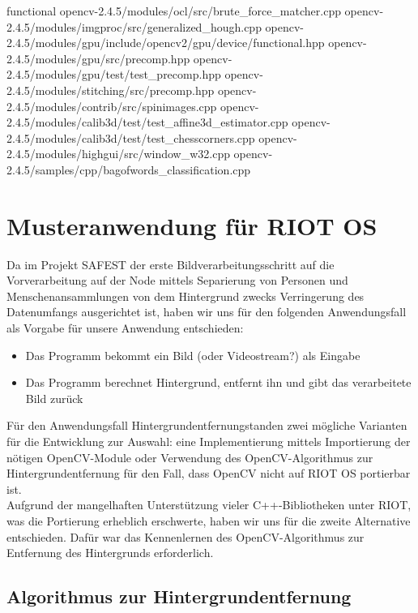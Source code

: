 \documentclass[10pt,a4paper]{article}
\begin{document}
functional \newline
opencv-2.4.5/modules/ocl/src/brute\_force\_matcher.cpp
opencv-2.4.5/modules/imgproc/src/generalized\_hough.cpp
opencv-2.4.5/modules/gpu/include/opencv2/gpu/device/functional.hpp
opencv-2.4.5/modules/gpu/src/precomp.hpp
opencv-2.4.5/modules/gpu/test/test\_precomp.hpp
opencv-2.4.5/modules/stitching/src/precomp.hpp
opencv-2.4.5/modules/contrib/src/spinimages.cpp
opencv-2.4.5/modules/calib3d/test/test\_affine3d\_estimator.cpp
opencv-2.4.5/modules/calib3d/test/test\_chesscorners.cpp
opencv-2.4.5/modules/highgui/src/window\_w32.cpp
opencv-2.4.5/samples/cpp/bagofwords\_classification.cpp




\newpage
\section{Musteranwendung für RIOT OS}


Da im Projekt SAFEST der erste Bildverarbeitungsschritt auf die Vorverarbeitung auf der Node mittels Separierung von Personen und Menschenansammlungen von dem Hintergrund zwecks Verringerung des Datenumfangs ausgerichtet ist, haben wir uns für den folgenden Anwendungsfall als Vorgabe für unsere Anwendung entschieden: 

\begin{itemize}
\item Das Programm bekommt ein Bild (oder Videostream?) als Eingabe
\item Das Programm berechnet Hintergrund, entfernt ihn und gibt das verarbeitete Bild zurück
\end{itemize}

Für den Anwendungsfall \glqq Hintergrundentfernung\grqq standen zwei mögliche Varianten für die Entwicklung zur Auswahl: eine Implementierung mittels Importierung der nötigen OpenCV-Module oder Verwendung des OpenCV-Algorithmus zur Hintergrundentfernung für den Fall, dass OpenCV nicht auf RIOT OS portierbar ist. \\

Aufgrund der mangelhaften Unterstützung vieler C++-Bibliotheken unter RIOT, was die Portierung erheblich erschwerte, haben wir uns für die zweite Alternative entschieden. Dafür war das Kennenlernen des OpenCV-Algorithmus zur Entfernung des Hintergrunds erforderlich. \\

\subsection{Algorithmus zur Hintergrundentfernung}
\end{document}
